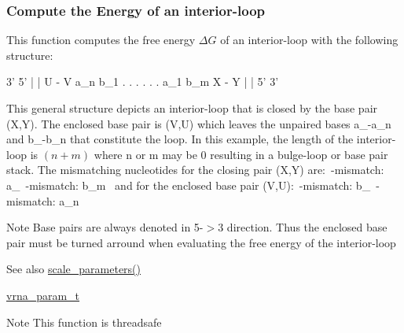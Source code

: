 \subsubsection*{Compute the Energy of an interior-\/loop}

This function computes the free energy $\Delta G$ of an interior-\/loop with the following structure\+: ~\newline
 
\begin{DoxyPre}
      3'  5'
      |   |
      U - V
  a\_n       b\_1
   .        .
   .        .
   .        .
  a\_1       b\_m
      X - Y
      |   |
      5'  3'
\end{DoxyPre}
 This general structure depicts an interior-\/loop that is closed by the base pair (X,Y). The enclosed base pair is (V,U) which leaves the unpaired bases a\+\_-\/a\+\_\+n and b\+\_-\/b\+\_\+n that constitute the loop. In this example, the length of the interior-\/loop is $(n+m)$ where n or m may be 0 resulting in a bulge-\/loop or base pair stack. The mismatching nucleotides for the closing pair (X,Y) are\+:~\textquotesingle{}-\/mismatch\+: a\+\_~\textquotesingle{}-\/mismatch\+: b\+\_\+m~\newline
 and for the enclosed base pair (V,U)\+:~\textquotesingle{}-\/mismatch\+: b\+\_~\textquotesingle{}-\/mismatch\+: a\+\_\+n~\newline
 \begin{DoxyNote}{Note}
Base pairs are always denoted in 5\textquotesingle{}-\/$>$3\textquotesingle{} direction. Thus the enclosed base pair must be \textquotesingle{}turned arround\textquotesingle{} when evaluating the free energy of the interior-\/loop 
\end{DoxyNote}
\begin{DoxySeeAlso}{See also}
\hyperlink{group__energy__parameters_ga541f2cf7436e9bc939b0a49b24baf987}{scale\+\_\+parameters()} 

\hyperlink{group__energy__parameters_ga8a69ca7d787e4fd6079914f5343a1f35}{vrna\+\_\+param\+\_\+t} 
\end{DoxySeeAlso}
\begin{DoxyNote}{Note}
This function is threadsafe
\end{DoxyNote}


